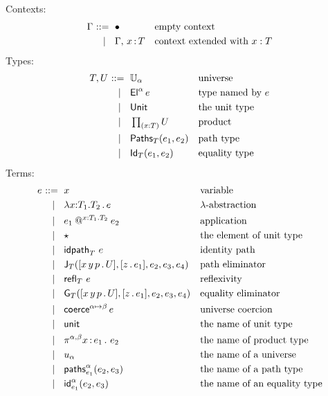 \documentclass{article}
\begin{document}
Contexts:
%
\begin{equation*}
  \Gamma
  \begin{aligned}[t]
    \ \mathrel{{:}{:}{=}}\    {}& \bullet & & \text{empty context}\\
    \ \mid\ \  {}& \Gamma,\, x\, {:}\, T & & \text{context extended with $x : T$}
  \end{aligned}
\end{equation*}
%
Types:
%
\begin{equation*}
  T, U
  \begin{aligned}[t]
    \ \mathrel{{:}{:}{=}}\    {}& \mathbb{U}_{\alpha} & & \text{universe}\\
    \ \mid\ \  {}& \mathsf{El}^{\alpha}\, e & & \text{type named by $e$}\\
    \ \mid\ \  {}& \mathsf{Unit} & & \text{the unit type}\\
    \ \mid\ \  {}& \mathop{\textstyle\prod_{(x {:} T)}} U & & \text{product}\\
    \ \mid\ \  {}& \mathsf{Paths}_{T}(e_1,e_2) & & \text{path type}\\
    \ \mid\ \  {}& \mathsf{Id}_{T}(e_1,e_2) & & \text{equality type}
  \end{aligned}
\end{equation*}
%
Terms:
%
\begin{equation*}
  e
  \begin{aligned}[t]
    \ \mathrel{{:}{:}{=}}\    {}&  x   &&\text{variable} \\
    \ \mid\ \  {}&  \lambda x {:} T_1.{T_2}\,.\, e  &&\text{$\lambda$-abstraction} \\
    \ \mid\ \  {}&  e_1\mathbin{@^{x{:}T_1.T_2}} e_2  &&\text{application} \\
    \ \mid\ \  {}&  \star  &&\text{the element of unit type} \\
    \ \mid\ \  {}&  {\mathsf{idpath}_{T}}\ {e}  &&\text{identity path} \\
    \ \mid\ \  {}&  \mathsf{J}_{T}([x\,y\,p \,.\, U], [z \,.\, e_1], e_2, e_3, e_4)  &&\text{path eliminator} \\
    \ \mid\ \  {}&  {\mathsf{refl}_{T}}\  e  &&\text{reflexivity} \\
    \ \mid\ \  {}&  \mathsf{G}_{T}([x\,y\,p \,.\, U], [z \,.\, e_1], e_2, e_3, e_4)  &&\text{equality eliminator} \\
    \ \mid\ \  {}&  \mathsf{coerce}^{\alpha{\mapsto}\beta} \, e  &&\text{universe coercion} \\
    \ \mid\ \  {}&  \mathsf{unit}  &&\text{the name of unit type} \\
    \ \mid\ \  {}&  \pi^{\alpha,\beta} x\,{:}\,e_1 \,.\  e_2  &&\text{the name of product type} \\
    \ \mid\ \  {}&  u_{\alpha} &&\text{the name of a universe} \\
    \ \mid\ \  {}&  \mathsf{paths}^{\alpha}_{e_1}(e_2,e_3)  &&\text{the name of a path type} \\
    \ \mid\ \  {}&  \mathsf{id}^{\alpha}_{e_1}(e_2,e_3)  &&\text{the name of an equality type}
  \end{aligned}
\end{equation*}
\end{document}
